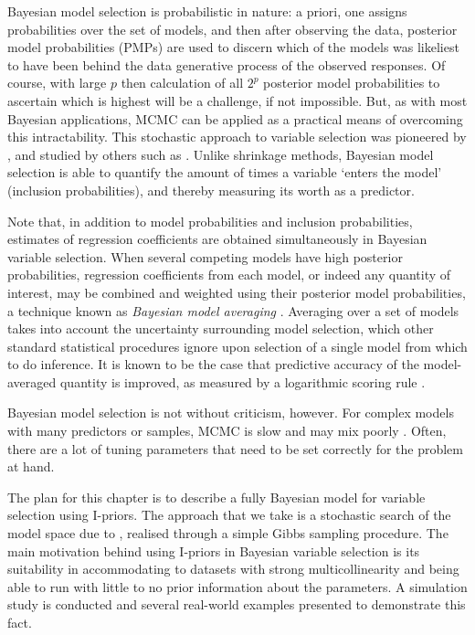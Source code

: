 \documentclass[showframe,11pt,twoside,openright]{report}
\begin{document}
Bayesian model selection is probabilistic in nature: a priori, one assigns probabilities over the set of models, and then after observing the data, posterior model probabilities (PMPs) are used to discern which of the models was likeliest to have been behind the data generative process of the observed responses.
Of course, with large  $p$ then calculation of all $2^p$ posterior model probabilities to ascertain which is highest will be a challenge, if not impossible.
But, as with most Bayesian applications, MCMC can be applied as a practical means of overcoming this intractability.
This stochastic approach to variable selection was pioneered by \citet{George1993}, and studied by others such as \citet{Kuo1998,dellaportas2002bayesian,Ntzoufras2008}.
Unlike shrinkage methods, Bayesian model selection is able to quantify the amount of times a variable `enters the model' (inclusion probabilities), and thereby measuring its worth as a  predictor.


Note that, in addition to model probabilities and inclusion probabilities, estimates of regression coefficients are obtained simultaneously in Bayesian variable selection.
When several competing models have high posterior probabilities, regression coefficients from each model, or indeed any quantity of interest, may be combined and weighted using their posterior model probabilities, a technique known as \emph{Bayesian model averaging} \citep{madigan1994model,hoeting1999bayesian}.
Averaging over a set of models takes into account the uncertainty surrounding model selection, which other standard statistical procedures ignore upon selection of a single model from which to do inference.
It is known to be the case that predictive accuracy of the model-averaged quantity is improved, as measured by a logarithmic scoring rule \citep{raftery1997bayesian}.

Bayesian model selection is not without criticism, however.
For complex models with many predictors or samples, MCMC is slow and may mix poorly \citep{OHara2009}.
Often, there are a lot of tuning parameters that need to be set correctly for the problem at hand.

The plan for this chapter is to describe a fully Bayesian model for variable selection using I-priors. 
The approach that we take is a stochastic search of the model space due to \citet{Kuo1998}, realised through a simple Gibbs sampling procedure.
The main motivation behind using I-priors in Bayesian variable selection is its suitability in accommodating to datasets with strong multicollinearity and being able to run with little to no prior information about the parameters.
A simulation study is conducted and several real-world examples presented to demonstrate this fact. 
\end{document}
